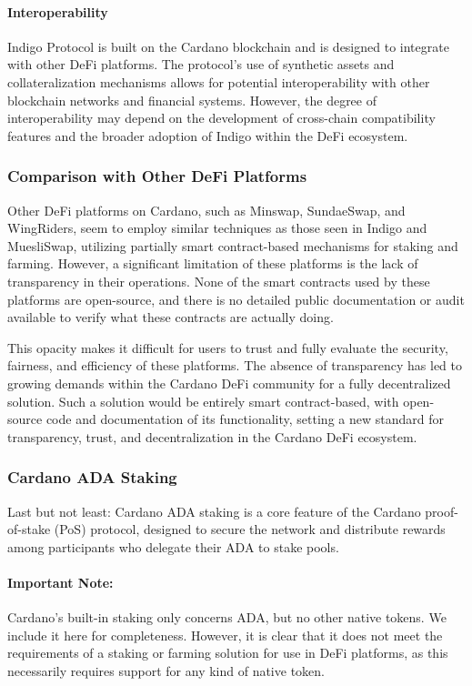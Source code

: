 \documentclass[12pt,parskip=full, tikz]{article}
\begin{document}
\paragraph{Interoperability}

Indigo Protocol is built on the Cardano blockchain and is designed to integrate with other DeFi platforms. The protocol's use of synthetic assets and collateralization mechanisms allows for potential interoperability with other blockchain networks and financial systems. However, the degree of interoperability may depend on the development of cross-chain compatibility features and the broader adoption of Indigo within the DeFi ecosystem.


\subsubsection{Comparison with Other DeFi Platforms}

Other DeFi platforms on Cardano, such as Minswap, SundaeSwap, and WingRiders, seem to employ similar techniques as those seen in Indigo and MuesliSwap, utilizing partially smart contract-based mechanisms for staking and farming. However, a significant limitation of these platforms is the lack of transparency in their operations. None of the smart contracts used by these platforms are open-source, and there is no detailed public documentation or audit available to verify what these contracts are actually doing.

This opacity makes it difficult for users to trust and fully evaluate the security, fairness, and efficiency of these platforms. The absence of transparency has led to growing demands within the Cardano DeFi community for a fully decentralized solution. Such a solution would be entirely smart contract-based, with open-source code and documentation of its functionality, setting a new standard for transparency, trust, and decentralization in the Cardano DeFi ecosystem.


\subsubsection{Cardano ADA Staking}

Last but not least: Cardano ADA staking is a core feature of the Cardano proof-of-stake (PoS) protocol, designed to secure the network and distribute rewards among participants who delegate their ADA to stake pools.

\paragraph{Important Note:} Cardano's built-in staking only concerns ADA, but no other native tokens. We include it here for completeness. However, it is clear that it does not meet the requirements of a staking or farming solution for use in DeFi platforms, as this necessarily requires support for any kind of native token.
\end{document}
